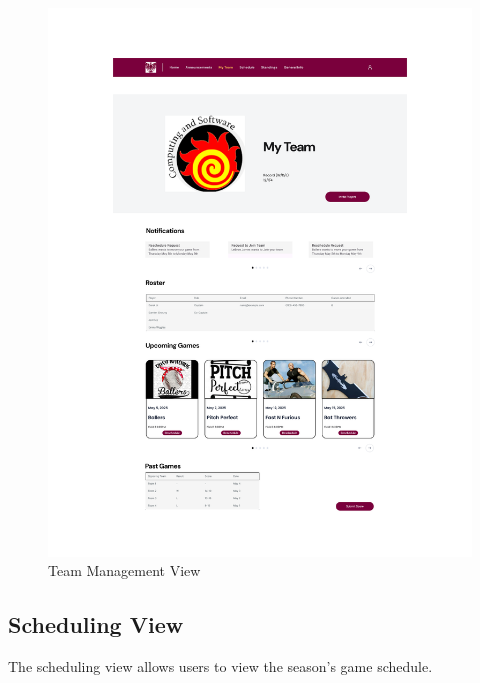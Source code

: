 \documentclass[12pt, titlepage]{article}
\begin{document}
\begin{figure}[H]
  \centering
  \includegraphics[scale=0.7]{TeamHomeView.pdf}
  \caption{Team Management View}
  \label{fig:team_management_view}
\end{figure}

\newpage

\subsection{Scheduling View}
The scheduling view allows users to view the season's game schedule.
\end{document}
